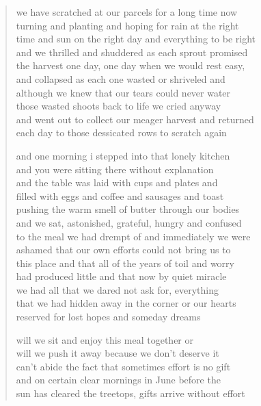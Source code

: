 
\begin{verse}
we have scratched at our parcels for a long time now \\
turning and planting and hoping for rain at the right  \\
time and sun on the right day and everything to be right \\
and we thrilled and shuddered as each sprout promised \\
the harvest one day, one day when we would rest easy, \\
and collapsed as each one wasted or shriveled and  \\
although we knew that our tears could never water  \\
those wasted shoots back to life we cried anyway \\
and went out to collect our meager harvest and returned \\
each day to those dessicated rows to scratch again

and one morning i stepped into that lonely kitchen \\
and you were sitting there without explanation  \\
and the table was laid with cups and plates and \\
filled with eggs and coffee and sausages and toast \\
pushing the warm smell of butter through our bodies \\
and we sat, astonished, grateful, hungry and confused  \\
to the meal we had drempt of and immediately we were \\
ashamed that our own efforts could not bring us to \\
this place and that all of the years of toil and worry \\
had produced little and that now by quiet miracle \\
we had all that we dared not ask for, everything  \\
that we had hidden away in the corner or our hearts \\
reserved for lost hopes and someday dreams

will we sit and enjoy this meal together or \\
will we push it away because we don't deserve it \\
can't abide the fact that sometimes effort is no gift \\
and on certain clear mornings in June before the  \\
sun has cleared the treetops, gifts arrive without effort
\end{verse}
